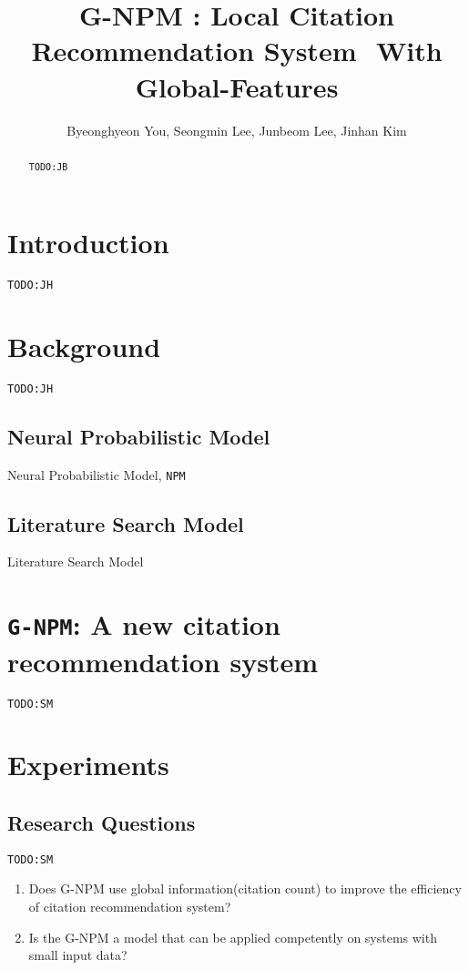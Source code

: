 \documentclass{llncs}
\newcommand{\name}{\texttt{G-NPM}\xspace}
\newcommand{\npm}{\texttt{NPM}\xspace}
\newcommand{\todo}[1]{\texttt{\color{red}TODO:#1}}
\begin{document}
\title{G-NPM : Local Citation Recommendation System  With Global-Features}

\author{Byeonghyeon You, Seongmin Lee, Junbeom Lee, Jinhan Kim}


\maketitle

\begin{abstract}
\todo{JB}

\end{abstract}

\section{Introduction}
\label{sec:introduction}
\todo{JH}

\section{Background}
\todo{JH}
\subsection{Neural Probabilistic Model}
Neural Probabilistic Model, \npm ~\cite{Huang:2015:NPM:2886521.2886655}
\subsection{Literature Search Model}
Literature Search Model~\cite{Bethard:2010:ICL:1871437.1871517}

\section{\name: A new citation recommendation system}
\todo{SM}


\section{Experiments}
\subsection{Research Questions}
\todo{SM}

\begin{enumerate}
\item Does G-NPM use global information(citation count) to improve the efficiency of citation recommendation system?
\item Is the G-NPM a model that can be applied competently on systems with small input data?
\end{enumerate}
\end{document}
